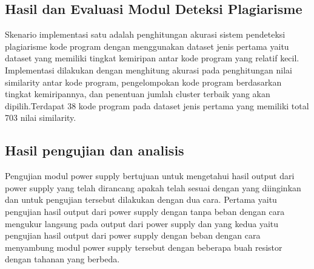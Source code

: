\subsection{Hasil dan Evaluasi Modul Deteksi Plagiarisme}
Skenario implementasi satu adalah penghitungan akurasi sistem pendeteksi plagiarisme kode program dengan menggunakan dataset jenis pertama yaitu dataset yang memiliki tingkat kemiripan antar kode program yang relatif kecil. Implementasi dilakukan dengan menghitung akurasi pada penghitungan nilai similarity antar kode program, pengelompokan kode program berdasarkan tingkat kemiripannya, dan penentuan jumlah cluster terbaik yang akan dipilih.Terdapat 38 kode program pada dataset jenis pertama yang memiliki total 703 nilai similarity.
\subsection{Hasil pengujian dan analisis}
Pengujian modul power supply bertujuan  untuk mengetahui hasil output dari power supply yang telah dirancang apakah telah sesuai dengan yang diinginkan dan untuk pengujian tersebut dilakukan dengan dua cara. Pertama yaitu pengujian hasil output dari power supply dengan tanpa beban dengan cara mengukur langsung pada output dari power supply  dan yang kedua yaitu pengujian hasil output dari power supply dengan beban dengan cara menyambung modul power supply tersebut dengan beberapa buah resistor dengan tahanan yang berbeda.

